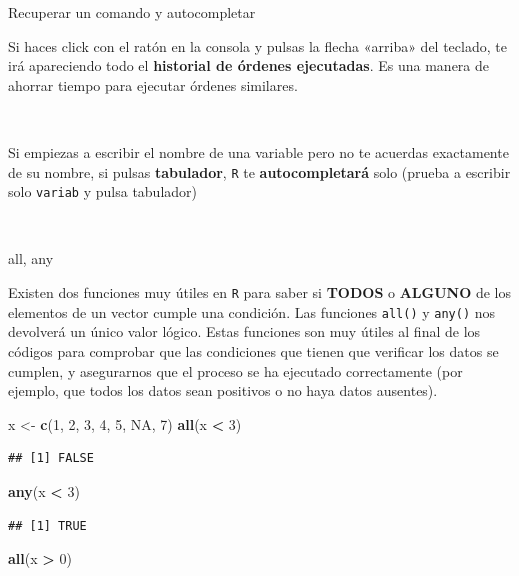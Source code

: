 \documentclass[11pt,]{book}
\newenvironment{Shaded}{\begin{snugshade}}{\end{snugshade}}
\newcommand{\DecValTok}[1]{\textcolor[rgb]{0.06,0.06,0.06}{#1}}
\newcommand{\KeywordTok}[1]{\textcolor[rgb]{0.27,0.27,0.27}{\textbf{#1}}}
\newcommand{\NormalTok}[1]{#1}
\newcommand{\OperatorTok}[1]{\textcolor[rgb]{0.43,0.43,0.43}{\textbf{#1}}}
\newcommand{\OtherTok}[1]{\textcolor[rgb]{0.37,0.37,0.37}{#1}}
\newcommand{\StringTok}[1]{\textcolor[rgb]{0.5,0.5,0.5}{#1}}
\begin{document}
Recuperar un comando y autocompletar

Si haces click con el ratón en la consola y pulsas la flecha «arriba» del teclado, te irá apareciendo todo el \textbf{historial de órdenes ejecutadas}. Es una manera de ahorrar tiempo para ejecutar órdenes similares.

~

Si empiezas a escribir el nombre de una variable pero no te acuerdas exactamente de su nombre, si pulsas \textbf{tabulador}, \texttt{R} te \textbf{autocompletará} solo (prueba a escribir solo \texttt{variab} y pulsa tabulador)

~

all, any

Existen dos funciones muy útiles en \texttt{R} para saber si \textbf{TODOS} o \textbf{ALGUNO} de los elementos de un vector cumple una condición. Las funciones \texttt{all()} y \texttt{any()} nos devolverá un único valor lógico. Estas funciones son muy útiles al final de los códigos para comprobar que las condiciones que tienen que verificar los datos se cumplen, y asegurarnos que el proceso se ha ejecutado correctamente (por ejemplo, que todos los datos sean positivos o no haya datos ausentes).

\begin{Shaded}
\begin{Highlighting}[]
\NormalTok{x <-}\StringTok{ }\KeywordTok{c}\NormalTok{(}\DecValTok{1}\NormalTok{, }\DecValTok{2}\NormalTok{, }\DecValTok{3}\NormalTok{, }\DecValTok{4}\NormalTok{, }\DecValTok{5}\NormalTok{, }\OtherTok{NA}\NormalTok{, }\DecValTok{7}\NormalTok{)}
\KeywordTok{all}\NormalTok{(x }\OperatorTok{<}\StringTok{ }\DecValTok{3}\NormalTok{)}
\end{Highlighting}
\end{Shaded}

\begin{verbatim}
## [1] FALSE
\end{verbatim}

\begin{Shaded}
\begin{Highlighting}[]
\KeywordTok{any}\NormalTok{(x }\OperatorTok{<}\StringTok{ }\DecValTok{3}\NormalTok{)}
\end{Highlighting}
\end{Shaded}

\begin{verbatim}
## [1] TRUE
\end{verbatim}

\begin{Shaded}
\begin{Highlighting}[]
\KeywordTok{all}\NormalTok{(x }\OperatorTok{>}\StringTok{ }\DecValTok{0}\NormalTok{)}
\end{Highlighting}
\end{Shaded}
\end{document}

